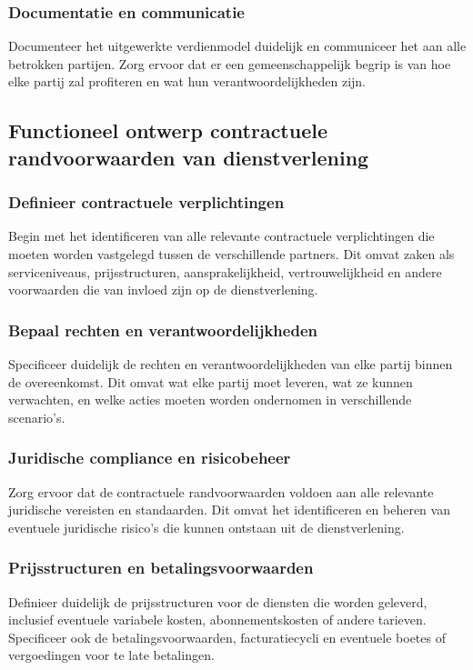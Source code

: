 \documentclass[../main.tex]{subfiles}
\begin{document}
\subsubsection{Documentatie en communicatie}
Documenteer het uitgewerkte verdienmodel duidelijk en communiceer het aan alle betrokken partijen. Zorg ervoor dat er een gemeenschappelijk begrip is van hoe elke partij zal profiteren en wat hun verantwoordelijkheden zijn.

\subsection{Functioneel ontwerp contractuele randvoorwaarden van dienstverlening}

\subsubsection{Definieer contractuele verplichtingen}
Begin met het identificeren van alle relevante contractuele verplichtingen die moeten worden vastgelegd tussen de verschillende partners. Dit omvat zaken als serviceniveaus, prijsstructuren, aansprakelijkheid, vertrouwelijkheid en andere voorwaarden die van invloed zijn op de dienstverlening.

\subsubsection{Bepaal rechten en verantwoordelijkheden}
Specificeer duidelijk de rechten en verantwoordelijkheden van elke partij binnen de overeenkomst. Dit omvat wat elke partij moet leveren, wat ze kunnen verwachten, en welke acties moeten worden ondernomen in verschillende scenario's.

\subsubsection{Juridische compliance en risicobeheer}
Zorg ervoor dat de contractuele randvoorwaarden voldoen aan alle relevante juridische vereisten en standaarden. Dit omvat het identificeren en beheren van eventuele juridische risico's die kunnen ontstaan uit de dienstverlening.

\subsubsection{Prijsstructuren en betalingsvoorwaarden}
Definieer duidelijk de prijsstructuren voor de diensten die worden geleverd, inclusief eventuele variabele kosten, abonnementskosten of andere tarieven. Specificeer ook de betalingsvoorwaarden, facturatiecycli en eventuele boetes of vergoedingen voor te late betalingen.
\end{document}

